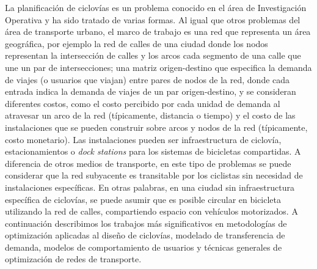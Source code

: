 

  La planificación de ciclovías es un problema conocido en el área de Investigación Operativa y ha sido tratado de varias formas. Al igual que otros problemas del área de transporte urbano, el marco de trabajo es una red que representa un área geográfica, por ejemplo la red de calles de una ciudad donde los nodos representan la intersección de calles y los arcos cada segmento de una calle que une un par de intersecciones; una matriz origen-destino que especifica la demanda de viajes (o usuarios que viajan) entre pares de nodos de la red, donde cada entrada indica la demanda de viajes de un par origen-destino, y se consideran diferentes costos, como el costo percibido por cada unidad de demanda al atravesar un arco de la red (típicamente, distancia o tiempo) y el costo de las instalaciones que se pueden construir sobre arcos y nodos de la red (típicamente, costo monetario). Las instalaciones pueden ser infraestructura de ciclovía, estacionamientos o {\it dock stations} para los sistemas de bicicletas compartidas. A diferencia de otros medios de transporte, en este tipo de problemas se puede considerar que la red subyacente es transitable por los ciclistas sin necesidad de instalaciones específicas. En otras palabras, en una ciudad sin infraestructura específica de ciclovías, se puede asumir que es posible circular en bicicleta utilizando la red de calles, compartiendo espacio con vehículos motorizados. A continuación describimos los trabajos más significativos en metodologías de optimización aplicadas al diseño de ciclovías, modelado de transferencia de demanda, modelos de comportamiento de usuarios y técnicas generales de optimización de redes de transporte.

